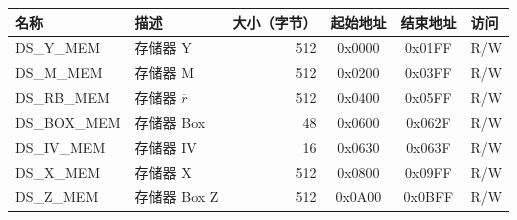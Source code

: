 \begin{longtable}{ | l | l | r | c | c | l | }
\hline
\rowcolor{lightgray}
\textbf{名称} & \textbf{描述}  &  \textbf{大小（字节）}  &  \textbf{起始地址}  &  \textbf{结束地址}  & \textbf{访问}   \\ \hline
DS\_Y\_MEM\label{DSYMEM} & 存储器 Y  & 512  & 0x0000 & 0x01FF & R/W \\ \hline
DS\_M\_MEM\label{DSMMEM} & 存储器 M & 512  & 0x0200 & 0x03FF & R/W \\ \hline
DS\_RB\_MEM\label{DSRBMEM} & 存储器 $\overline{r}$  & 512  & 0x0400 & 0x05FF & R/W \\ \hline
DS\_BOX\_MEM\label{DSBOXMEM} & 存储器 Box  & 48  & 0x0600 & 0x062F & R/W \\ \hline
DS\_IV\_MEM\label{DSIVMEM} & 存储器 IV  & 16  & 0x0630 & 0x063F & R/W \\ \hline
DS\_X\_MEM\label{DSXMEM} & 存储器 X  & 512  & 0x0800 & 0x09FF & R/W \\ \hline
DS\_Z\_MEM\label{DSZMEM} & 存储器 Box Z  & 512  & 0x0A00 & 0x0BFF & R/W \\ \hline
\end{longtable}
